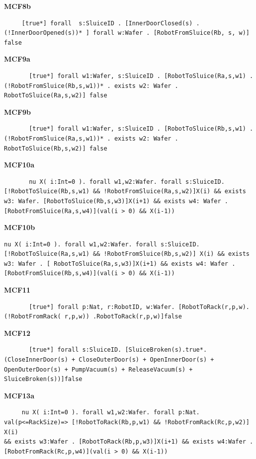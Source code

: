 \documentclass[12pt]{report}
\begin{document}
    \textbf{MCF8b}
    \begin{lstlisting}
     [true*] forall  s:SluiceID . [InnerDoorClosed(s) . (!InnerDoorOpened(s))* ] forall w:Wafer . [RobotFromSluice(Rb, s, w)] false
    \end{lstlisting}

    \textbf{MCF9a}
    \begin{lstlisting}
       [true*] forall w1:Wafer, s:SluiceID . [RobotToSluice(Ra,s,w1) . (!RobotFromSluice(Rb,s,w1))* . exists w2: Wafer . RobotToSluice(Ra,s,w2)] false
    \end{lstlisting}

    \textbf{MCF9b}
    \begin{lstlisting}
       [true*] forall w1:Wafer, s:SluiceID . [RobotToSluice(Rb,s,w1) . (!RobotFromSluice(Ra,s,w1))* . exists w2: Wafer . RobotToSluice(Rb,s,w2)] false
    \end{lstlisting}

    \textbf{MCF10a}
    \begin{lstlisting}
       nu X( i:Int=0 ). forall w1,w2:Wafer. forall s:SluiceID. [!RobotToSluice(Rb,s,w1) && !RobotFromSluice(Ra,s,w2)]X(i) && exists w3: Wafer. [RobotToSluice(Rb,s,w3)]X(i+1) && exists w4: Wafer .[RobotFromSluice(Ra,s,w4)](val(i > 0) && X(i-1))
    \end{lstlisting}

    \textbf{MCF10b}
    \begin{lstlisting}
nu X( i:Int=0 ). forall w1,w2:Wafer. forall s:SluiceID. [!RobotToSluice(Ra,s,w1) && !RobotFromSluice(Rb,s,w2)] X(i) && exists w3: Wafer . [ RobotToSluice(Ra,s,w3)]X(i+1) && exists w4: Wafer .[RobotFromSluice(Rb,s,w4)](val(i > 0) && X(i-1))
    \end{lstlisting}

    \textbf{MCF11}
    \begin{lstlisting}
       [true*] forall p:Nat, r:RobotID, w:Wafer. [RobotToRack(r,p,w).(!RobotFromRack( r,p,w)) .RobotToRack(r,p,w)]false
    \end{lstlisting}

    \textbf{MCF12}
    \begin{lstlisting}
       [true*] forall s:SluiceID. [SluiceBroken(s).true*.(CloseInnerDoor(s) + CloseOuterDoor(s) + OpenInnerDoor(s) + OpenOuterDoor(s) + PumpVacuum(s) + ReleaseVacuum(s) + SluiceBroken(s))]false
    \end{lstlisting}

    \textbf{MCF13a}
    \begin{lstlisting}
     nu X( i:Int=0 ). forall w1,w2:Wafer. forall p:Nat. val(p<=RackSize)=> [!RobotToRack(Rb,p,w1) && !RobotFromRack(Rc,p,w2)] X(i)
&& exists w3:Wafer . [RobotToRack(Rb,p,w3)]X(i+1) && exists w4:Wafer . [RobotFromRack(Rc,p,w4)](val(i > 0) && X(i-1))
    \end{lstlisting}
\end{document}
